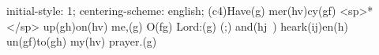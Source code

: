 initial-style: 1;
centering-scheme: english;
(c4)Have(g) mer(hv)cy(gf) <sp>*</sp> up(gh)on(hv) me,(g) O(fg) Lord:(g) (;) and(hj~) heark(ij)en(h) un(gf)to(gh) my(hv) prayer.(g)
